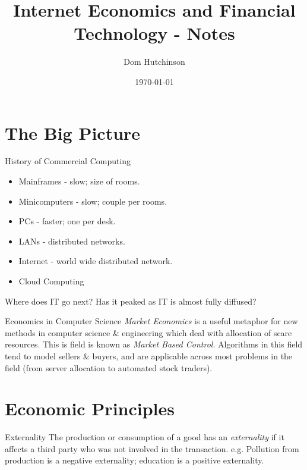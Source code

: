 \documentclass[11pt,a4paper]{article}
\begin{document}
\title{Internet Economics and Financial Technology - Notes}
\author{Dom Hutchinson}
\date{\today}
\maketitle

\tableofcontents\newpage

\section{The Big Picture}

  \begin{remark}{History of Commercial Computing}
    \begin{itemize}
      \item[\textit{1950-60}] Mainframes - slow; size of rooms.
      \item[\textit{1960-70}] Minicomputers - slow; couple per rooms.
      \item[\textit{1970-80}] PCs - faster; one per desk.
      \item[\textit{1980-90}] LANs - distributed networks.
      \item[\textit{1990-10}] Internet - world wide distributed network.
      \item[\textit{2010-20}] Cloud Computing
    \end{itemize}
    Where does IT go next? Has it peaked as IT is almost fully diffused?
  \end{remark}

  \begin{remark}{Economics in Computer Science}
    \textit{Market Economics} is a useful metaphor for new methods in computer science \& engineering which deal with allocation of scare resources. This is field is known as \textit{Market Based Control}. Algorithms in this field tend to model sellers \& buyers, and are applicable across most problems in the field (from server allocation to automated stock traders).
  \end{remark}

\section{Economic Principles}

  \begin{definition}{Externality}
    The production or consumption of a good has an \textit{externality} if it affects a third party who was not involved in the transaction. e.g. Pollution from production is a negative externality; education is a positive externality.
  \end{definition}
\end{document}
